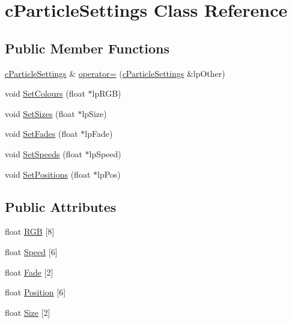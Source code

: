 \hypertarget{classc_particle_settings}{
\section{cParticleSettings Class Reference}
\label{classc_particle_settings}
}
\subsection*{Public Member Functions}
\begin{DoxyCompactItemize}
\item 
\hyperlink{classc_particle_settings}{cParticleSettings} \& \hyperlink{classc_particle_settings_a9110bcaa5061955325254223768454b3}{operator=} (\hyperlink{classc_particle_settings}{cParticleSettings} \&lpOther)
\item 
void \hyperlink{classc_particle_settings_abba7ff47f88b99b9cf64e7ce573fb7e4}{SetColours} (float $\ast$lpRGB)
\item 
void \hyperlink{classc_particle_settings_acc8ce55286b3392a6b41c594d40a55f4}{SetSizes} (float $\ast$lpSize)
\item 
void \hyperlink{classc_particle_settings_a7b5a0b1ca4cc5005b82d7a9f5f7dad04}{SetFades} (float $\ast$lpFade)
\item 
void \hyperlink{classc_particle_settings_a2199fc363f7a560b250840f158e8f744}{SetSpeeds} (float $\ast$lpSpeed)
\item 
void \hyperlink{classc_particle_settings_a1c6c07742b6dfa717ed8640d4c481805}{SetPositions} (float $\ast$lpPos)
\end{DoxyCompactItemize}
\subsection*{Public Attributes}
\begin{DoxyCompactItemize}
\item 
float \hyperlink{classc_particle_settings_af8e7761264c98c5f874b6be87ffd2c57}{RGB} \mbox{[}8\mbox{]}
\item 
float \hyperlink{classc_particle_settings_a52bf5cd5e94039617ba61a42fabf5b05}{Speed} \mbox{[}6\mbox{]}
\item 
float \hyperlink{classc_particle_settings_a82cdd319afba5bb182ff3d15b9137232}{Fade} \mbox{[}2\mbox{]}
\item 
float \hyperlink{classc_particle_settings_ac04a5e0b7d79825cf6221389a4829133}{Position} \mbox{[}6\mbox{]}
\item 
float \hyperlink{classc_particle_settings_a46ca8d9e95f99693d7202d223c16918e}{Size} \mbox{[}2\mbox{]}
\end{DoxyCompactItemize}


